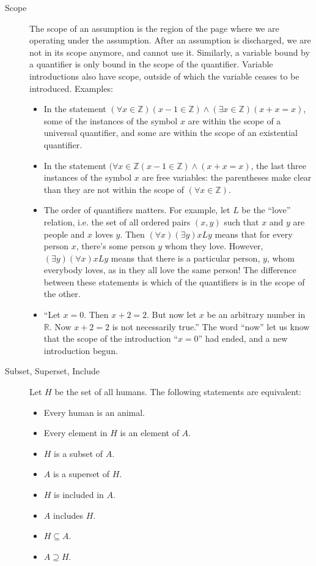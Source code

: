 \documentclass[12pt]{article}
\begin{document}
\begin{description}
  \item[Scope] The scope of an assumption is the region of the page
    where we are operating under the assumption.  After an assumption
    is discharged, we are not in its scope anymore, and cannot use it.
    Similarly, a variable bound by a quantifier is only bound in the
    scope of the quantifier.  Variable introductions also have scope,
    outside of which the variable ceases to be introduced.  Examples:

    \begin{itemize}
      \item In the statement $(\forall
        x\in\mathbb{Z})(x-1\in\mathbb{Z})\wedge(\exists
        x\in\mathbb{Z})(x+x=x)$, some of the instances of the symbol
        $x$ are within the scope of a universal quantifier, and some
        are within the scope of an existential quantifier.
      \item In the statement $(\forall
        x\in\mathbb{Z}(x-1\in\mathbb{Z})\wedge (x+x=x)$, the last
        three instances of the symbol $x$ are free variables: the
        parentheses make clear than they are not within the scope of
        $(\forall x\in\mathbb{Z})$.
      \item The order of quantifiers matters.  For example, let $L$ be
        the ``love'' relation, i.e. the set of all ordered pairs
        $(x,y)$ such that $x$ and $y$ are people and $x$ loves $y$.
        Then $(\forall x)(\exists y)xLy$ means that for every person
        $x$, there's some person $y$ whom they love.  However,
        $(\exists y)(\forall x)xLy$ means that there is a particular
        person, $y$, whom everybody loves, as in they all love the
        same person!  The difference between these statements is which
        of the quantifiers is in the scope of the other.
      \item ``Let $x=0$.  Then $x+2=2$.  But now let $x$ be an
        arbitrary number in $\mathbb{R}$.  Now $x+2=2$ is not
        necessarily true.''  The word ``now'' let us know that the
        scope of the introduction ``$x=0$'' had ended, and a new
        introduction begun.
    \end{itemize}
    
  \item[Subset, Superset, Include] Let $H$ be the set of all humans.
    The following statements are equivalent:
    \begin{itemize}
    \item Every human is an animal. 
    \item Every element in $H$ is an element of $A$. 
    \item $H$ is a subset of $A$. 
    \item $A$ is a superset of $H$. 
    \item $H$ is included in $A$. 
    \item $A$ includes $H$. 
    \item $H\subseteq A$. 
    \item $A\supseteq H$. 
    \end{itemize}
  

\end{description}
\end{document}
